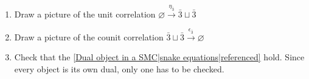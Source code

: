 
\begin{enumerate}
    \item Draw a picture of the unit correlation $\varnothing \xrightarrow{\eta_{\bar 3}} \bar 3 \sqcup \bar 3$
    \item Draw a picture of the counit correlation $\bar 3 \sqcup \bar 3 \xrightarrow{\epsilon_{\bar 3}} \varnothing$
    \item Check that the \ref{Dual object in a SMC|snake equations|referenced} hold. Since every object is its own dual, only one has to be checked.
  \end{enumerate}